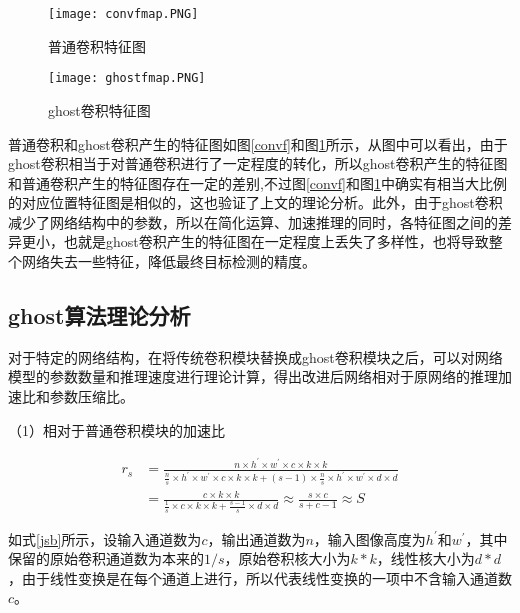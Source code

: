 \begin{figure}[htbp]
	\centering
	\begin{minipage}{0.49\linewidth}
		\centering
		\texttt{[image: convfmap.PNG]}
		\caption{普通卷积特征图}
		\label{convf}%
	\end{minipage}
	\begin{minipage}{0.49\linewidth}
		\centering
		\texttt{[image: ghostfmap.PNG]}
		\caption{ghost卷积特征图}
		\label{ghostf}%
	\end{minipage}
\end{figure}

普通卷积和ghost卷积产生的特征图如图\ref{convf}和图\ref{ghostf}所示，从图中可以看出，由于ghost卷积相当于对普通卷积进行了一定程度的转化，所以ghost卷积产生的特征图和普通卷积产生的特征图存在一定的差别,不过图\ref{convf}和图\ref{ghostf}中确实有相当大比例的对应位置特征图是相似的，这也验证了上文的理论分析。此外，由于ghost卷积减少了网络结构中的参数，所以在简化运算、加速推理的同时，各特征图之间的差异更小，也就是ghost卷积产生的特征图在一定程度上丢失了多样性，也将导致整个网络失去一些特征，降低最终目标检测的精度。

\subsection{ghost算法理论分析}
对于特定的网络结构，在将传统卷积模块替换成ghost卷积模块之后，可以对网络模型的参数数量和推理速度进行理论计算，得出改进后网络相对于原网络的推理加速比和参数压缩比。

（1）相对于普通卷积模块的加速比

\begin{equation}
    \begin{aligned}
    r_{s} &=\frac{n \times h^{\prime} \times w^{\prime} \times c \times k \times k}{\frac{n}{s} \times h^{\prime} \times w^{\prime} \times c \times k \times k+(s-1) \times \frac{n}{s} \times h^{\prime} \times w^{\prime} \times d \times d} \\
    &=\frac{c \times k \times k}{\frac{1}{s} \times c \times k \times k+\frac{s-1}{s} \times d \times d} \approx \frac{s \times c}{s+c-1} \approx S
    \end{aligned}
    \label{jsb}
\end{equation}

如式\ref{jsb}所示，设输入通道数为$c$，输出通道数为$n$，输入图像高度为$h^{\prime}$和$w^{\prime}$，其中保留的原始卷积通道数为本来的$1/s$，原始卷积核大小为$k*k$，线性核大小为$d*d$，由于线性变换是在每个通道上进行，所以代表线性变换的一项中不含输入通道数$c$。

